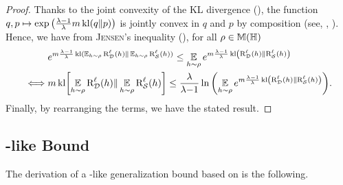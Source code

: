 \begin{noaddcontents}
\begin{proof}
Thanks to the joint convexity of the KL divergence (), the function $q,p \mapsto \exp\left( \frac{\lambda-1}{\lambda}m\operatorname{kl}(q\|p)\right)$ is jointly convex in $q$ and $p$ by composition (see, \eg, \citet{BoydVandenberghe2014}).
Hence, we have from \textsc{Jensen}'s inequality (), for all $\rho\in\mathbb{M}(\mathbb{H})$
\begin{align*}
&e^{m\frac{\lambda{-}1}{\lambda}\operatorname{kl}(\operatorname*{\mathbb{E}}_{h\sim\rho}\text{R}^{\ell}_{\mathcal{D}}(h)\|\operatorname*{\mathbb{E}}_{h\sim\rho}\text{R}^{\ell}_{\mathcal{S}}(h))} \le \operatorname*{\mathbb{E}}_{h\sim\rho}e^{m\frac{\lambda{-}1}{\lambda}\operatorname{kl}\left(\text{R}^{\ell}_{\mathcal{D}}(h)\|\text{R}^{\ell}_{\mathcal{S}}(h)\right)}\\
\iff &m\operatorname{kl}\!\left[\operatorname*{\mathbb{E}}_{h\sim\rho}\text{R}^{\ell}_{\mathcal{D}}(h)\|\operatorname*{\mathbb{E}}_{h\sim\rho}\text{R}^{\ell}_{\mathcal{S}}(h)\right] \le \frac{\lambda}{\lambda{-}1}\ln\left( \operatorname*{\mathbb{E}}_{h\sim\rho}e^{m\frac{\lambda{-}1}{\lambda}\operatorname{kl}\left(\text{R}^{\ell}_{\mathcal{D}}(h)\|\text{R}^{\ell}_{\mathcal{S}}(h)\right)}\right)\!.
\end{align*}
Finally, by rearranging the terms, we have the stated result.
\end{proof}

\subsection{\citeauthor{Catoni2007}-like Bound}

The derivation of a \citet{Catoni2007}-like generalization bound based on  is the following.


\end{noaddcontents}
